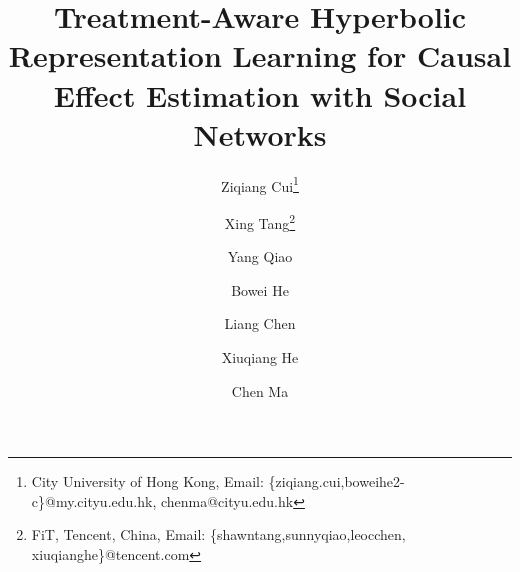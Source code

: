 \documentclass[twoside,leqno,twocolumn]{article}
\begin{document}
\setlength{\abovedisplayskip}{5pt}   
\setlength{\belowdisplayskip}{5pt}

%
\newcommand\relatedversion{}


\title{\Large Treatment-Aware Hyperbolic Representation Learning for Causal
Effect Estimation with Social Networks\relatedversion}
\author{Ziqiang Cui\thanks{City University of Hong Kong, Email:
\{ziqiang.cui,boweihe2-c\}@my.cityu.edu.hk, chenma@cityu.edu.hk} \footnotemark[3]
\and Xing Tang\thanks{FiT, Tencent, China, Email: \{shawntang,sunnyqiao,leocchen,\\xiuqianghe\}@tencent.com}
\and Yang Qiao\footnotemark[2]
\and Bowei He\footnotemark[1]
\and Liang Chen\footnotemark[2]
\and Xiuqiang He\footnotemark[2]
\and Chen Ma\footnotemark[1] \footnotemark[4]
}

\date{}

\maketitle

\renewcommand{\thefootnote}{\fnsymbol{footnote}}

\end{document}
